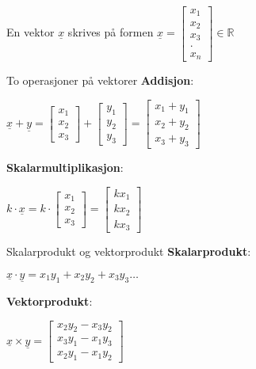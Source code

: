 \documentclass[11pt, a4paper, norsk]{article}
\begin{document}
        En vektor $\underline{x}$ skrives på formen $\underline{x} = \begin{bmatrix}
            x_1 \\
            x_2 \\
            x_3 \\
            . \\
            x_{n}
        \end{bmatrix} \in \mathbb{R}$

        \begin{Formel}{To operasjoner på vektorer}{}
            \textbf{Addisjon}:

            $\underline{x} + \underline{y} = \begin{bmatrix}
                x_1 \\
                x_2 \\
                x_3
            \end{bmatrix} + \begin{bmatrix}
                y_1 \\
                y_2 \\
                y_3
            \end{bmatrix} = \begin{bmatrix}
                x_1 + y_1 \\
                x_2 + y_2 \\
                x_3 + y_3
            \end{bmatrix}$

            \textbf{Skalarmultiplikasjon}:
            
            $k\cdot \underline{x} = k \cdot \begin{bmatrix}
                x_1 \\
                x_2 \\
                x_3
            \end{bmatrix} = \begin{bmatrix}
                kx_1 \\
                kx_2 \\
                kx_3
            \end{bmatrix}$
        \end{Formel}
        
        \begin{Formel}{Skalarprodukt og vektorprodukt}{}
            \textbf{Skalarprodukt}:

            $\underline{x} \cdot \underline{y} = x_1y_1 + x_2y_2 + x_3y_3 \dots$

            \textbf{Vektorprodukt}:

            $\underline{x} \times \underline{y} = \begin{bmatrix}
                x_2y_2 - x_3y_2 \\
                x_3y_1 - x_1y_3 \\
                x_2y_1 - x_1y_2
            \end{bmatrix}$
        \end{Formel}
\end{document}

